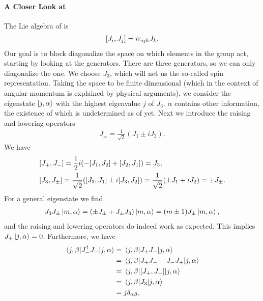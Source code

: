 \paragraph{A Closer Look at }
The Lie algebra of  is
\begin{align*}
	\comm{J_{i}}{J_{j}} = i\varepsilon_{ijk}J_{k}.
\end{align*}
Our goal is to block diagonalize the space on which elements in the group act, starting by looking at the generators. There are three generators, so we can only diagonalize the one. We choose $J_{3}$, which will net us the so-called spin representation. Taking the space to be finite dimensional (which in the context of angular momentum is explained by physical arguments), we consider the eigenstate $\ket{j, \alpha}$ with the highest eigenvalue $j$ of $J_{3}$. $\alpha$ contains other information, the existence of which is undetermined as of yet. Next we introduce the raising and lowering operators
\begin{align*}
	J_{\pm} = \frac{1}{\sqrt{2}}(J_{1} \pm iJ_{2}).
\end{align*}
We have
\begin{align*}
	&\comm{J_{+}}{J_{-}} = \frac{1}{2}i(-\comm{J_{1}}{J_{2}} + \comm{J_{2}}{J_{1}}) = J_{3}, \\
	&\comm{J_{3}}{J_{\pm}} = \frac{1}{\sqrt{2}}(\comm{J_{3}}{J_{1}} \pm i\comm{J_{3}}{J_{2}}) = \frac{1}{\sqrt{2}}(\pm J_{1} + iJ_{2}) = \pm J_{\pm}.
\end{align*}
For a general eigenstate we find
\begin{align*}
	J_{3}J_{\pm}\ket{m, \alpha} = (\pm J_{\pm} + J_{\pm}J_{3})\ket{m, \alpha} = (m \pm 1)J_{\pm}\ket{m, \alpha},
\end{align*}
and the raising and lowering operators do indeed work as expected. This implies $J_{+}\ket{j, \alpha} = 0$. Furthermore, we have
\begin{align*}
	\mel{j, \beta}{J_{-}\adj J_{-}}{j, \alpha} &= \mel{j, \beta}{J_{+}J_{-}}{j, \alpha} \\
	                                           &= \mel{j, \beta}{J_{+}J_{-} - J_{-}J_{+}}{j, \alpha} \\
	                                           &= \mel{j, \beta}{\comm{J_{+}}{J_{-}}}{j, \alpha} \\
	                                           &= \mel{j, \beta}{J_{3}}{j, \alpha} \\
	                                           &= j\delta_{\alpha\beta},
\end{align*}
